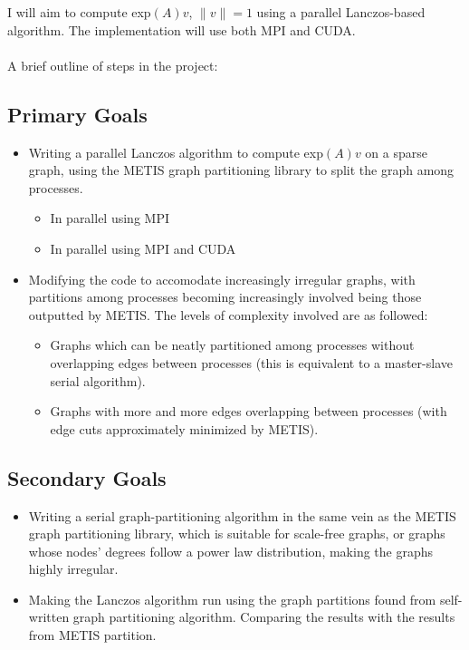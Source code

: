 \documentclass[a4paper, fleqn]{article}
\begin{document}
I will aim to compute exp$(A)v$, $\|v\| = 1$ using a parallel Lanczos-based algorithm. The implementation will use both MPI and CUDA.
\\ \\ A brief outline of steps in the project:

\subsection*{Primary Goals}%
\label{sub:primary_goals}

\begin{itemize}
        \item Writing a parallel Lanczos algorithm to compute exp$(A)v$ on a sparse graph, using the METIS graph partitioning library to split the graph among processes. 
                \begin{itemize}
                        \item In parallel using MPI
                        \item In parallel using MPI and CUDA
                \end{itemize}
        \item Modifying the code to accomodate increasingly irregular graphs, with partitions among processes becoming increasingly involved being those outputted by METIS. The levels of complexity involved are as followed:
                \begin{itemize}
                        \item Graphs which can be neatly partitioned among processes without overlapping edges between processes (this is equivalent to a master-slave serial algorithm).
                        \item Graphs with more and more edges overlapping between processes (with edge cuts approximately minimized by METIS).
                \end{itemize}
\end{itemize}

\subsection*{Secondary Goals}%
\label{sub:subsection_name}


\begin{itemize}
        \item Writing a serial graph-partitioning algorithm in the same vein as the METIS graph partitioning library, which is suitable for scale-free graphs, or graphs whose nodes' degrees follow a power law distribution, making the graphs highly irregular.
        \item Making the Lanczos algorithm run using the graph partitions found from self-written graph partitioning algorithm. Comparing the results with the results from METIS partition.
\end{itemize}
\end{document}
